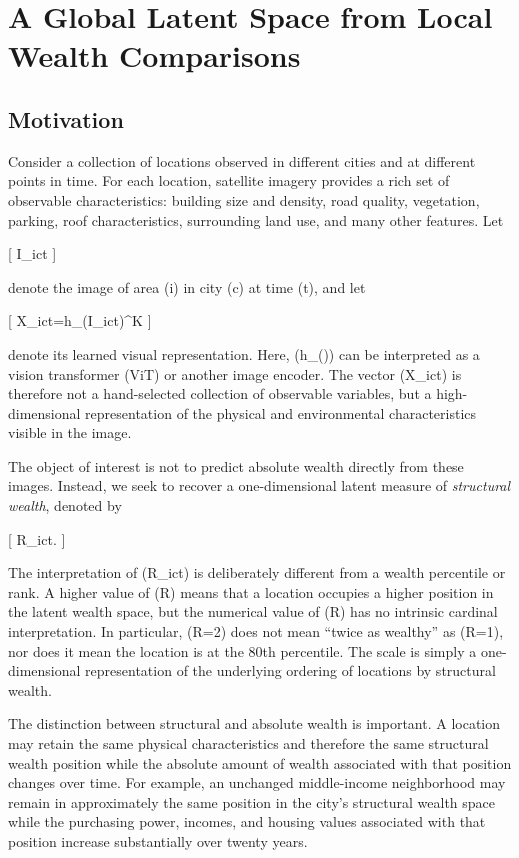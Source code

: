 \section{A Global Latent Space from Local Wealth Comparisons}

\subsection{Motivation}

Consider a collection of locations observed in different cities and at different points in time. For each location, satellite imagery provides a rich set of observable characteristics: building size and density, road quality, vegetation, parking, roof characteristics, surrounding land use, and many other features. Let

[
I_{ict}
]

denote the image of area (i) in city (c) at time (t), and let

[
X_{ict}=h_{\theta}(I_{ict})\in{}^{K}
]

denote its learned visual representation. Here, (h_{\theta}(\cdot)) can be interpreted as a vision transformer (ViT) or another image encoder. The vector (X_{ict}) is therefore not a hand-selected collection of observable variables, but a high-dimensional representation of the physical and environmental characteristics visible in the image.

The object of interest is not to predict absolute wealth directly from these images. Instead, we seek to recover a one-dimensional latent measure of \emph{structural wealth}, denoted by

[
R_{ict}\in{}.
]

The interpretation of (R_{ict}) is deliberately different from a wealth percentile or rank. A higher value of (R) means that a location occupies a higher position in the latent wealth space, but the numerical value of (R) has no intrinsic cardinal interpretation. In particular, (R=2) does not mean ``twice as wealthy'' as (R=1), nor does it mean the location is at the 80th percentile. The scale is simply a one-dimensional representation of the underlying ordering of locations by structural wealth.

The distinction between structural and absolute wealth is important. A location may retain the same physical characteristics and therefore the same structural wealth position while the absolute amount of wealth associated with that position changes over time. For example, an unchanged middle-income neighborhood may remain in approximately the same position in the city's structural wealth space while the purchasing power, incomes, and housing values associated with that position increase substantially over twenty years.

